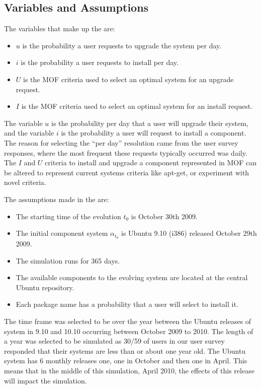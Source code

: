 \subsection{Variables and Assumptions}
The variables that make up the \usermodel are: 
\begin{itemize}
  \item $u$ is the probability a user requests to upgrade the system per day.
  \item $i$ is the probability a user requests to install per day.
  \item $U$ is the MOF criteria used to select an optimal system for an upgrade request.
  \item $I$ is the MOF criteria used to select an optimal system for an install request.
\end{itemize}

The variable $u$ is the probability per day that a user will upgrade their system, and the variable $i$ is the probability a user will request to install a component.
The reason for selecting the ``per day'' resolution came from the user survey responses, where the most frequent these requests typically occurred was daily.
The $I$ and $U$ criteria to install and upgrade a component represented in MOF can be altered to represent current systems criteria like apt-get,
or experiment with novel criteria.

The assumptions made in the \usermodel are:
\begin{itemize}
  \item The starting time of the evolution $t_0$ is October 30th 2009.
  \item The initial component system $\alpha_{t_0}$ is Ubuntu 9.10 (i386) released October 29th 2009.
  \item The simulation runs for 365 days.
  \item The available components to the evolving system are located at the central Ubuntu repository.
  \item Each package name has a probability that a user will select to install it. 
\end{itemize}

The time frame was selected to be over the year between the Ubuntu releases of system in 9.10 and 10.10 occurring between October 2009 to 2010.
The length of a year was selected to be simulated as 30/59 of users in our user survey responded that their systems are less than or about one year old.
The Ubuntu system has 6 monthly releases one, one in October and then one in April.
This means that in the middle of this simulation, April 2010, the effects of this release will impact the simulation.

